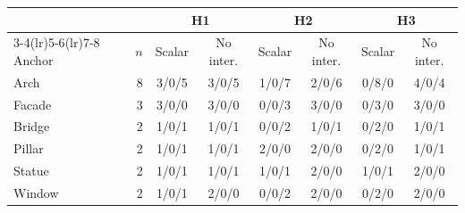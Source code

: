 \begin{tabular}{lr cccccc}
\toprule
& & \multicolumn{2}{c}{H1} & \multicolumn{2}{c}{H2} & \multicolumn{2}{c}{H3} \\
\cmidrule(lr){3-4}\cmidrule(lr){5-6}\cmidrule(lr){7-8}
Anchor & $n$ & Scalar & No inter. & Scalar & No inter. & Scalar & No inter. \\
\midrule
Arch & 8 & 3/0/5 & 3/0/5 & 1/0/7 & 2/0/6 & 0/8/0 & 4/0/4 \\
Facade & 3 & 3/0/0 & 3/0/0 & 0/0/3 & 3/0/0 & 0/3/0 & 3/0/0 \\
Bridge & 2 & 1/0/1 & 1/0/1 & 0/0/2 & 1/0/1 & 0/2/0 & 1/0/1 \\
Pillar & 2 & 1/0/1 & 1/0/1 & 2/0/0 & 2/0/0 & 0/2/0 & 1/0/1 \\
Statue & 2 & 1/0/1 & 1/0/1 & 1/0/1 & 2/0/0 & 1/0/1 & 2/0/0 \\
Window & 2 & 1/0/1 & 2/0/0 & 0/0/2 & 2/0/0 & 0/2/0 & 2/0/0 \\
\bottomrule
\end{tabular}
